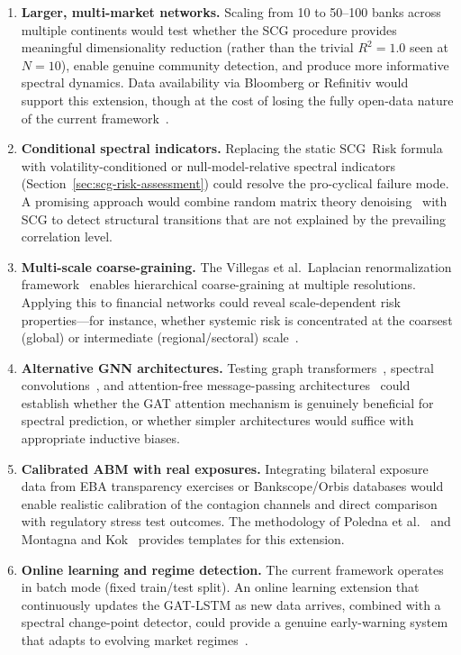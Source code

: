 \begin{enumerate}
    \item \textbf{Larger, multi-market networks.} Scaling from 10 to 50--100 banks across multiple continents would test whether the SCG procedure provides meaningful dimensionality reduction (rather than the trivial $R^2=1.0$ seen at $N=10$), enable genuine community detection, and produce more informative spectral dynamics. Data availability via Bloomberg or Refinitiv would support this extension, though at the cost of losing the fully open-data nature of the current framework~\cite{newman2003structure,barabasi2016network}.

    \item \textbf{Conditional spectral indicators.} Replacing the static SCG~Risk formula with volatility-conditioned or null-model-relative spectral indicators (Section~\ref{sec:scg-risk-assessment}) could resolve the pro-cyclical failure mode. A promising approach would combine random matrix theory denoising~\cite{laloux1999noise} with SCG to detect structural transitions that are not explained by the prevailing correlation level.

    \item \textbf{Multi-scale coarse-graining.} The Villegas et al.\ Laplacian renormalization framework~\cite{villegas2023laplacian} enables hierarchical coarse-graining at multiple resolutions. Applying this to financial networks could reveal scale-dependent risk properties---for instance, whether systemic risk is concentrated at the coarsest (global) or intermediate (regional/sectoral) scale~\cite{arenas2006synchronization,mucha2010community}.

    \item \textbf{Alternative GNN architectures.} Testing graph transformers~\cite{bruna2014spectral}, spectral convolutions~\cite{defferrard2016convolutional}, and attention-free message-passing architectures~\cite{gilmer2017neural} could establish whether the GAT attention mechanism is genuinely beneficial for spectral prediction, or whether simpler architectures would suffice with appropriate inductive biases.

    \item \textbf{Calibrated ABM with real exposures.} Integrating bilateral exposure data from EBA transparency exercises or Bankscope/Orbis databases would enable realistic calibration of the contagion channels and direct comparison with regulatory stress test outcomes. The methodology of Poledna et al.~\cite{poledna2015economics} and Montagna and Kok~\cite{montagna2016multi} provides templates for this extension.

    \item \textbf{Online learning and regime detection.} The current framework operates in batch mode (fixed train/test split). An online learning extension that continuously updates the GAT-LSTM as new data arrives, combined with a spectral change-point detector, could provide a genuine early-warning system that adapts to evolving market regimes~\cite{holme2012temporal,masuda2017random}.
\end{enumerate}



